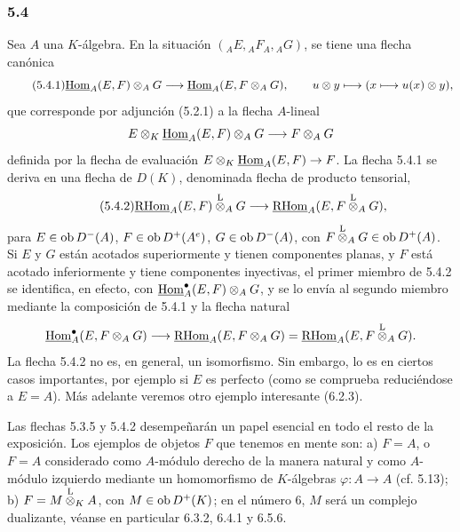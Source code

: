 \subsubsection*{5.4}

Sea $A$ una $K$-álgebra. En la situación $({}_AE,{}_AF_A,{}_AG)$, se tiene una flecha canónica
\begin{equation}\tag{5.4.1}
\underline{\operatorname{Hom}}_A(E,F)\otimes_AG\longrightarrow\underline{\operatorname{Hom}}_A(E,F\otimes_AG),
\qquad u\otimes y\longmapsto(x\longmapsto u(x)\otimes y),
\end{equation}
que corresponde por adjunción (5.2.1) a la flecha $A$-lineal
\[
E\otimes_K\underline{\operatorname{Hom}}_A(E,F)\otimes_AG\longrightarrow F\otimes_AG
\]
definida por la flecha de evaluación $E\otimes_K\underline{\operatorname{Hom}}_A(E,F)\to F$. La flecha 5.4.1 se deriva en una flecha de $D(K)$, denominada flecha de producto tensorial,
\begin{equation}\tag{5.4.2}
\underline{\mathrm{RHom}}_A(E,F)\overset{\mathrm L}{\otimes}_AG\longrightarrow\underline{\mathrm{RHom}}_A(E,F\overset{\mathrm L}{\otimes}_AG),
\end{equation}
para $E\in\operatorname{ob} D^-(A)$, $F\in\operatorname{ob} D^+(A^e)$, $G\in\operatorname{ob} D^-(A)$, con $F\overset{\mathrm L}{\otimes}_AG\in\operatorname{ob} D^+(A)$. Si $E$ y $G$ están acotados superiormente y tienen componentes planas, y $F$ está acotado inferiormente y tiene componentes inyectivas, el primer miembro de 5.4.2 se identifica, en efecto, con $\underline{\operatorname{Hom}}_A^\bullet(E,F)\otimes_AG$, y se lo envía al segundo miembro mediante la composición de 5.4.1 y la flecha natural
\[
\underline{\operatorname{Hom}}_A^\bullet(E,F\otimes_AG)\longrightarrow \underline{\mathrm{RHom}}_A(E,F\otimes_AG)=\underline{\mathrm{RHom}}_A(E,F\overset{\mathrm L}{\otimes}_AG).
\]
La flecha 5.4.2 no es, en general, un isomorfismo. Sin embargo, lo es en ciertos casos importantes, por ejemplo si $E$ es perfecto (como se comprueba reduciéndose a $E=A$). Más adelante veremos otro ejemplo interesante (6.2.3).

Las flechas 5.3.5 y 5.4.2 desempeñarán un papel esencial en todo el resto de la exposición. Los ejemplos de objetos $F$ que tenemos en mente son: a) $F=A$, o $F=A$ considerado como $A$-módulo derecho de la manera natural y como $A$-módulo izquierdo mediante un homomorfismo de $K$-álgebras $\varphi:A\to A$ (cf. 5.13); b) $F=M\overset{\mathrm L}{\otimes}_KA$, con $M\in\operatorname{ob} D^+(K)$; en el número 6, $M$ será un complejo dualizante, véanse en particular 6.3.2, 6.4.1 y 6.5.6.
